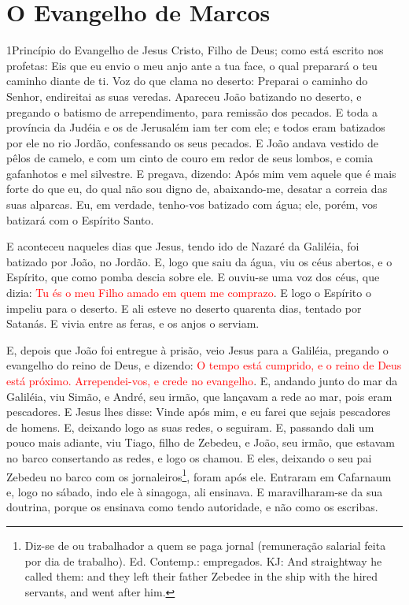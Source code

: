 \chapter*{O Evangelho de Marcos}

\lettrine{1} Princípio do Evangelho de Jesus Cristo, Filho de
Deus; como está escrito nos profetas: Eis que eu envio o meu
anjo ante a tua face, o qual preparará o teu caminho diante de ti.
Voz do que clama no deserto: Preparai o caminho do Senhor,
endireitai as suas veredas. Apareceu João batizando no deserto,
e pregando o batismo de arrependimento, para remissão dos pecados.
E toda a província da Judéia e os de Jerusalém iam ter com ele;
e todos eram batizados por ele no rio Jordão, confessando os seus
pecados. E João andava vestido de pêlos de camelo, e com um
cinto de couro em redor de seus lombos, e comia gafanhotos e mel
silvestre. E pregava, dizendo: Após mim vem aquele que é mais
forte do que eu, do qual não sou digno de, abaixando-me, desatar a
correia das suas alparcas. Eu, em verdade, tenho-vos batizado
com água; ele, porém, vos batizará com o Espírito Santo.

E aconteceu naqueles dias que Jesus, tendo ido de Nazaré da
Galiléia, foi batizado por João, no Jordão. E, logo que saiu
da água, viu os céus abertos, e o Espírito, que como pomba descia
sobre ele. E ouviu-se uma voz dos céus, que dizia: \textcolor{red}{Tu
és o meu Filho amado em quem me comprazo}. E logo o Espírito
o impeliu para o deserto. E ali esteve no deserto quarenta
dias, tentado por Satanás. E vivia entre as feras, e os anjos o
serviam.

E, depois que João foi entregue à prisão, veio Jesus para a
Galiléia, pregando o evangelho do reino de Deus, e dizendo:
\textcolor{red}{O tempo está cumprido, e o reino de Deus está próximo.
Arrependei-vos, e crede no evangelho}. E, andando junto do
mar da Galiléia, viu Simão, e André, seu irmão, que lançavam a rede
ao mar, pois eram pescadores. E Jesus lhes disse: Vinde após
mim, e eu farei que sejais pescadores de homens. E, deixando
logo as suas redes, o seguiram. E, passando dali um pouco
mais adiante, viu Tiago, filho de Zebedeu, e João, seu irmão, que
estavam no barco consertando as redes, e logo os chamou. E
eles, deixando o seu pai Zebedeu no barco com os
jornaleiros\footnote{Diz-se de ou trabalhador a quem se paga jornal
(remuneração salarial feita por dia de trabalho). Ed. Contemp.:
empregados. KJ: And straightway he called them: and they left their
father Zebedee in the ship with the hired servants, and went after
him.}, foram após ele. Entraram em Cafarnaum e, logo no
sábado, indo ele à sinagoga, ali ensinava. E maravilharam-se
da sua doutrina, porque os ensinava como tendo autoridade, e não
como os escribas.

